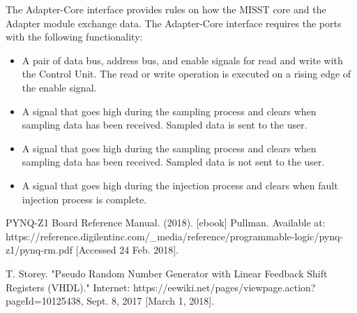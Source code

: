 \documentclass[]{report}
\begin{document}
The Adapter-Core interface provides rules on how the MISST core and the Adapter module exchange data. The Adapter-Core interface requires the ports with the following functionality:
\begin{itemize}
	\item A pair of data bus, address bus, and enable signals for read and write with the Control Unit. The read or write operation is executed on a rising edge of the enable signal.
	\item A signal that goes high during the sampling process and clears when sampling data has been received. Sampled data is sent to the user. \\
	\item A signal that goes high during the sampling process and clears when sampling data has been received. Sampled data is not sent to the user.\\
	\item A signal that goes high during the injection process and clears when fault injection process is complete.\\
\end{itemize}

\begin{thebibliography}{2}
	PYNQ-Z1 Board Reference Manual. (2018). [ebook] Pullman. Available at: https://reference.digilentinc.com/\_media/reference/programmable-logic/pynq-z1/pynq-rm.pdf [Accessed 24 Feb. 2018].
	
	 T. Storey. "Pseudo Random Number Generator with Linear Feedback Shift Registers (VHDL)." Internet: https://eewiki.net/pages/viewpage.action?pageId=10125438, Sept. 8, 2017 [March 1, 2018].
	
\end{thebibliography}

	
\end{document}
